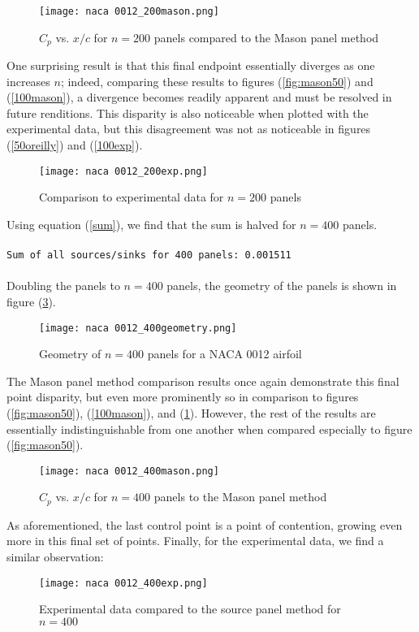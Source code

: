 \documentclass[12pt]{article}
\begin{document}
\begin{figure}[H]
    \centering
    \texttt{[image: naca 0012\_200mason.png]}
    \caption{$C_p$ vs. $x/c$ for $n = 200$ panels compared to the Mason panel method}
    \label{200mason}
\end{figure}
\noindent One surprising result is that this final endpoint essentially diverges as one increases $n$; indeed, comparing these results to figures (\ref{fig:mason50}) and (\ref{100mason}), a divergence becomes readily apparent and must be resolved in future renditions. This disparity is also noticeable when plotted with the experimental data, but this disagreement was not as noticeable in figures (\ref{50oreilly}) and (\ref{100exp}).
\begin{figure}[H]
    \centering
    \texttt{[image: naca 0012\_200exp.png]}
    \caption{Comparison to experimental data for $n = 200$ panels}
    \label{2990}
\end{figure}
\noindent Using equation (\ref{sum}), we find that the sum is halved for $n = 400$ panels. \\ \\
\texttt{Sum of all sources/sinks for 400 panels: 0.001511} \\ \\
\noindent Doubling the panels to $n = 400$ panels, the geometry of the panels is shown in figure (\ref{400geo}).
\begin{figure}[H]
    \centering
    \texttt{[image: naca 0012\_400geometry.png]}
    \caption{Geometry of $n = 400$ panels for a NACA 0012 airfoil}
    \label{400geo}
\end{figure}
\noindent The Mason panel method comparison results once again demonstrate this final point disparity, but even more prominently so in comparison to figures (\ref{fig:mason50}), (\ref{100mason}), and (\ref{200mason}). However, the rest of the results are essentially indistinguishable from one another when compared especially to figure (\ref{fig:mason50}).
\begin{figure}[H] 
    \centering
    \texttt{[image: naca 0012\_400mason.png]}
    \caption{$C_p$ vs. $x/c$ for $n = 400$ panels to the Mason panel method}
    \label{mason400}
\end{figure}
\noindent As aforementioned, the last control point is a point of contention, growing even more in this final set of points. Finally, for the experimental data, we find a similar observation:
\begin{figure}[H]
    \centering
    \texttt{[image: naca 0012\_400exp.png]}
    \caption{Experimental data compared to the source panel method for $n = 400$}
    \label{400exp}
\end{figure}
\end{document}
